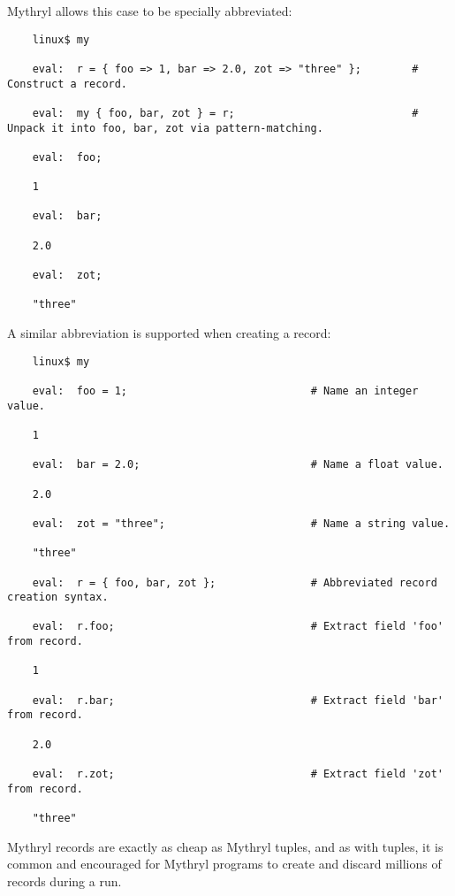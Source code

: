 Mythryl allows this case to be specially abbreviated: 

\begin{verbatim}
    linux$ my

    eval:  r = { foo => 1, bar => 2.0, zot => "three" };        # Construct a record.

    eval:  my { foo, bar, zot } = r;                            # Unpack it into foo, bar, zot via pattern-matching.

    eval:  foo;

    1

    eval:  bar;

    2.0

    eval:  zot;

    "three"

\end{verbatim}

A similar abbreviation is supported when creating a record:

\begin{verbatim}
    linux$ my

    eval:  foo = 1;                             # Name an integer value.

    1

    eval:  bar = 2.0;                           # Name a float value.

    2.0

    eval:  zot = "three";                       # Name a string value.

    "three"

    eval:  r = { foo, bar, zot };               # Abbreviated record creation syntax.

    eval:  r.foo;                               # Extract field 'foo' from record.

    1

    eval:  r.bar;                               # Extract field 'bar' from record.

    2.0

    eval:  r.zot;                               # Extract field 'zot' from record.

    "three"
\end{verbatim}

Mythryl records are exactly as cheap as Mythryl tuples, 
and as with tuples, it is common and encouraged for 
Mythryl programs to create and discard millions of 
records during a run.

\cutend*

